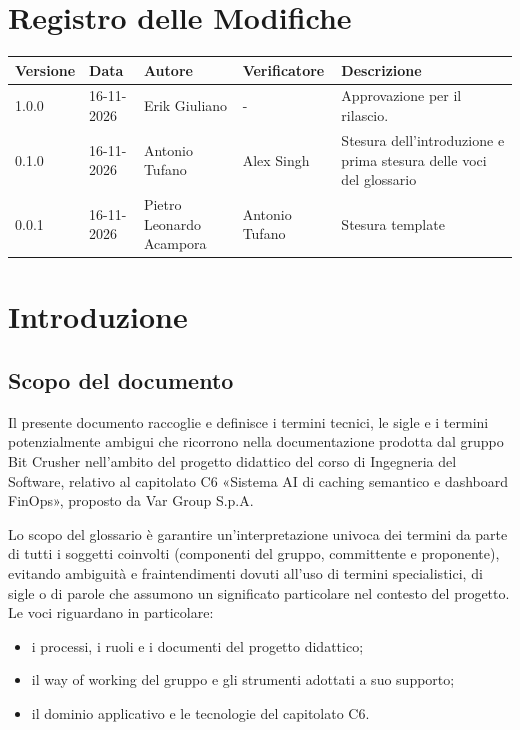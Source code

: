 \documentclass[a4paper, 11pt]{article}
\begin{document}
\section*{Registro delle Modifiche}
\begin{center}
    \renewcommand{\arraystretch}{1.5}
    \begin{tabularx}{\textwidth}{|l|l|>{\raggedright\arraybackslash}X|>{\raggedright\arraybackslash}X|>{\raggedright\arraybackslash}X|}
        \hline
        \textbf{Versione} & \textbf{Data} & \textbf{Autore} & \textbf{Verificatore} & \textbf{Descrizione} \\ \hline
        1.0.0 & 16-11-2026 & Erik Giuliano & - & Approvazione per il rilascio. \\ \hline
        0.1.0 & 16-11-2026 & Antonio Tufano & Alex Singh & Stesura dell'introduzione e prima stesura delle voci del glossario \\ \hline
        0.0.1 & 16-11-2026 & Pietro Leonardo Acampora & Antonio Tufano & Stesura template \\ \hline
    \end{tabularx}
\end{center}
\newpage

\tableofcontents
\newpage

\section{Introduzione}
\label{sec:introduzione}

\subsection{Scopo del documento}
Il presente documento raccoglie e definisce i termini tecnici, le sigle e i termini potenzialmente ambigui che ricorrono nella documentazione prodotta dal gruppo Bit Crusher nell'ambito del progetto didattico del corso di Ingegneria del Software, relativo al capitolato C6 «Sistema AI di caching semantico e dashboard FinOps», proposto da Var Group S.p.A.

Lo scopo del glossario è garantire un'interpretazione univoca dei termini da parte di tutti i soggetti coinvolti (componenti del gruppo, committente e proponente), evitando ambiguità e fraintendimenti dovuti all'uso di termini specialistici, di sigle o di parole che assumono un significato particolare nel contesto del progetto. Le voci riguardano in particolare:
\begin{itemize}
    \item i processi, i ruoli e i documenti del progetto didattico;
    \item il way of working del gruppo e gli strumenti adottati a suo supporto;
    \item il dominio applicativo e le tecnologie del capitolato C6.
\end{itemize}
\end{document}
